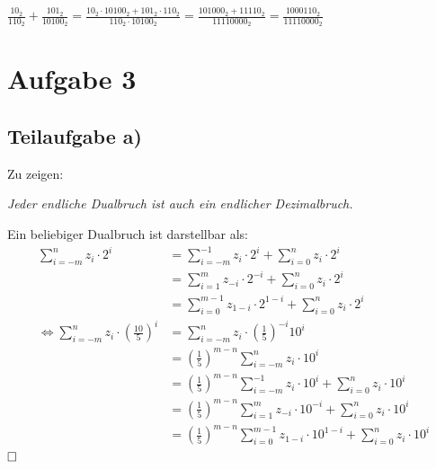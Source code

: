 \documentclass{llncs}
\begin{document}
$\frac{10_2}{110_2} + \frac{101_2}{10100_2} = \frac{10_2 \cdot 10100_2 + 101_2 \cdot 110_2}{110_2 \cdot 10100_2} = \frac{101000_2 + 11110_2}{11110000_2} = \frac{1000110_2}{11110000_2}$

\section*{Aufgabe 3}

\subsection*{Teilaufgabe a)}

Zu zeigen: 
\begin{center}
\textit{Jeder endliche Dualbruch ist auch ein endlicher Dezimalbruch.}
\end{center}
Ein beliebiger Dualbruch ist darstellbar als:
\begin{align*}
\sum_{i=-m}^{n} z_{i} \cdot 2^{i} &= \sum_{i=-m}^{-1} z_{i} \cdot 2^{i} + \sum_{i=0}^{n} z_{i} \cdot 2^{i} \\
                                  &= \sum_{i=1}^{m} z_{-i} \cdot 2^{-i} + \sum_{i=0}^{n} z_{i} \cdot 2^{i} \\
                                  &= \sum_{i=0}^{m-1} z_{1-i} \cdot 2^{1-i} + \sum_{i=0}^{n} z_{i} \cdot 2^{i}\\
\Leftrightarrow \sum_{i=-m}^{n} z_{i} \cdot \left( \frac{10}{5} \right)^{i} &= \sum_{i=-m}^{n} z_{i} \cdot \left(\frac{1}{5}\right)^{-i} 10^{i} \\
                                  &= \left(\frac{1}{5}\right)^{m-n} \sum_{i=-m}^{n} z_{i} \cdot 10^{i} \\
                                  &= \left(\frac{1}{5}\right)^{m-n} \sum_{i=-m}^{-1} z_{i} \cdot 10^{i} + \sum_{i=0}^{n} z_{i} \cdot 10^{i} \\
                                  &= \left(\frac{1}{5}\right)^{m-n} \sum_{i=1}^{m} z_{-i} \cdot 10^{-i} + \sum_{i=0}^{n} z_{i} \cdot 10^{i} \\
                                  &= \left(\frac{1}{5}\right)^{m-n} \sum_{i=0}^{m-1} z_{1-i} \cdot 10^{1-i} + \sum_{i=0}^{n} z_{i} \cdot 10^{i}
\end{align*}
$\hfill \square$

\end{document}

